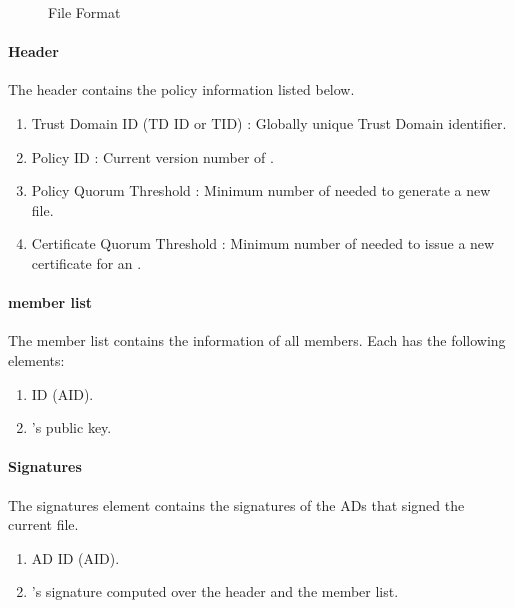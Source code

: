 \begin{figure}[h]
\centering
\begin{center}
\end{center}
\caption{\RT File Format}\label{fig:rot-file}
\end{figure}


\paragraph{Header}
The header contains the \TDC policy information listed below. 

\begin{enumerate}
\item Trust Domain ID (TD ID or TID) : Globally unique Trust Domain identifier.
\item Policy ID : Current version number of \PF.
\item Policy Quorum Threshold : Minimum number of \TDC \ADs needed to generate a new \RT file. 
\item Certificate Quorum Threshold : Minimum number of \TDC \ADs needed to issue a new certificate for an \AD.
\end{enumerate}

\paragraph{\TDC member list}
The \TDC member list contains the information of all \TDC members. Each \AD has the following elements:
\begin{enumerate}
\item \AD ID (AID).
\item \AD's public key.
\end{enumerate}

\paragraph{Signatures}
The signatures element contains the signatures of the \TDC ADs that signed the current \RT file.
\begin{enumerate}
\item AD ID (AID).
\item \AD's signature computed over the header and the \TDC member list.
\end{enumerate}

